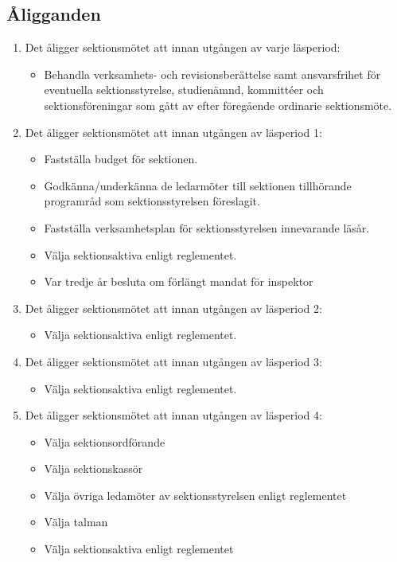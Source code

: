 \documentclass[11pt,a4paper]{article}
\begin{document}
\subsection{Åligganden}
\begin{enumerate}[\thesubsection.1]
  \item Det åligger sektionsmötet att innan utgången av varje läsperiod:
    \begin{itemize}
        \item Behandla verksamhets- och revisionsberättelse samt ansvarsfrihet för eventuella sektionsstyrelse, studienämnd, kommittéer och sektionsföreningar som gått av efter föregående ordinarie sektionsmöte. 
    \end{itemize}

  \item Det åligger sektionsmötet att innan utgången av läsperiod 1:
    \begin{itemize}
    \item Fastställa budget för sektionen.
    \item Godkänna/underkänna de ledarmöter till sektionen tillhörande programråd som sektionsstyrelsen föreslagit.
    \item Fastställa verksamhetsplan för sektionsstyrelsen innevarande läsår.
    \item Välja sektionsaktiva enligt reglementet. 
    \item Var tredje år besluta om förlängt mandat för inspektor
    \end{itemize}

  \item Det åligger sektionsmötet att innan utgången av läsperiod 2:
    \begin{itemize}
    \item Välja sektionsaktiva enligt reglementet.
    \end{itemize}

  \item Det åligger sektionsmötet att innan utgången av läsperiod 3:
    \begin{itemize}
    \item Välja sektionsaktiva enligt reglementet.
    \end{itemize}

  \item Det åligger sektionsmötet att innan utgången av läsperiod 4:
    \begin{itemize}
    \item Välja sektionsordförande
    \item Välja sektionskassör
    \item Välja övriga ledamöter av sektionsstyrelsen  enligt reglementet
    \item Välja talman
    \item Välja sektionsaktiva enligt reglementet
    \end{itemize}

\end{enumerate}
\end{document}
